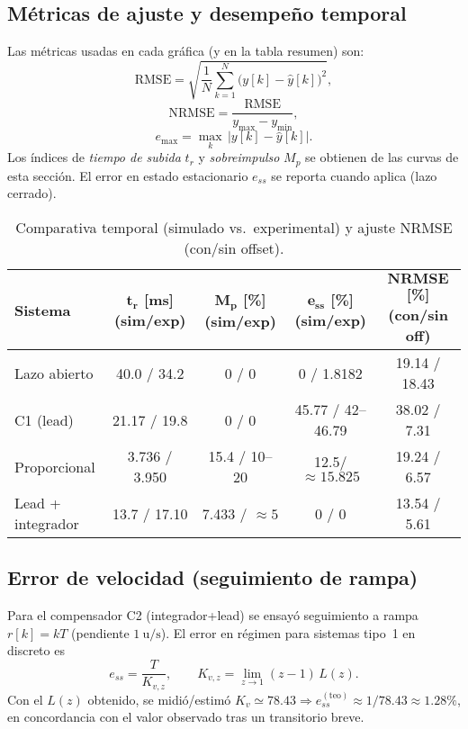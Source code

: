 \subsection{Métricas de ajuste y desempeño temporal}
Las métricas usadas en cada gráfica (y en la tabla resumen) son:
\begin{equation}
	\label{eq:rmse_temporal}
	\mathrm{RMSE}=\sqrt{\frac{1}{N}\sum_{k=1}^{N}\big(y[k]-\hat{y}[k]\big)^2},
\end{equation}
\begin{equation}
	\label{eq:rmse_porct}
	\mathrm{NRMSE}=\frac{\mathrm{RMSE}}{y_{\max}-y_{\min}},
\end{equation}
\begin{equation}
	\label{eq:emax_temporal}
	e_{\max}=\max_k\,\lvert y[k]-\hat{y}[k]\rvert.
\end{equation}
\balance
Los índices de \emph{tiempo de subida} \(t_r\) y \emph{sobreimpulso} \(M_p\) se obtienen de las curvas de esta sección. El error en estado estacionario \(e_{ss}\) se reporta cuando aplica (lazo cerrado).

\begin{table}[H]
	\centering
	\caption{Comparativa temporal (simulado vs.\ experimental) y ajuste NRMSE (con/sin offset).}
	\label{tab:comparativa_temporal_min}
	\begin{tabular}{lcccc}
		\toprule
		\textbf{Sistema} &
		\(\mathbf{t_r}\) [ms] (sim/exp) &
		\(\mathbf{M_p}\) [\%] (sim/exp) &
		\(\mathbf{e_{ss}}\) [\%] (sim/exp) &
		\(\mathbf{NRMSE}\) [\%] (con/sin off)\\
		\midrule
		Lazo abierto         & 40.0 / 34.2   & 0 / 0             & 0 / 1.8182                    & 19.14 / 18.43 \\
		C1 (lead)            & 21.17 / 19.8  & 0 / 0                 & 45.77 / 42--46.79   & 38.02 / 7.31 \\
		Proporcional         & 3.736 / 3.950 & 15.4 / 10--20         & 12.5/\(\approx 15.825\)                   & 19.24 / 6.57 \\
		Lead + integrador    & 13.7 / 17.10     & 7.433 / \(\approx 5\) & 0 / 0               & 13.54 / 5.61 \\
		\bottomrule
	\end{tabular}
\end{table}


\subsection{Error de velocidad (seguimiento de rampa)}
Para el compensador C2 (integrador+lead) se ensayó seguimiento a rampa \(r[k]=kT\) (pendiente \(1\ \mathrm{u}/\mathrm{s}\)). El error en régimen para sistemas tipo~1 en discreto es
\begin{equation}
	\label{eq:ess_rampa_discreto}
	e_{ss}=\frac{T}{K_{v,z}},\qquad K_{v,z}=\lim_{z\to1}(z-1)\,L(z).
\end{equation}
Con el \(L(z)\) obtenido, se midió/estimó \(K_v\simeq 78.43\Rightarrow e_{ss}^{(\mathrm{teo})}\approx 1/78.43\approx 1.28\%\), en concordancia con el valor observado tras un transitorio breve.

